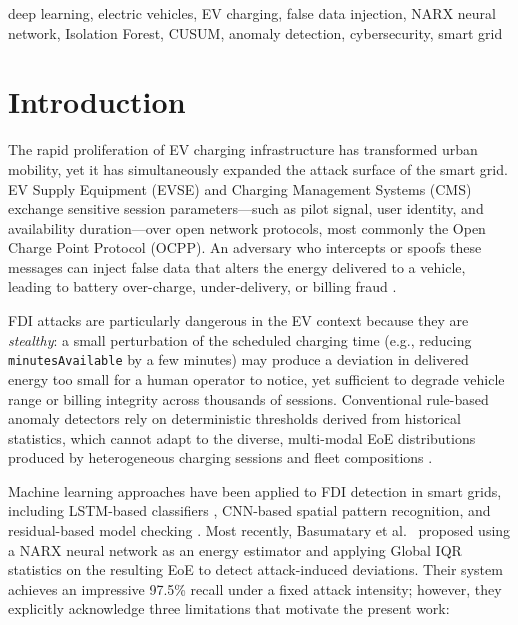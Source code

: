 \documentclass[journal]{IEEEtran}
\begin{document}
\begin{IEEEkeywords}
deep learning, electric vehicles, EV charging, false data injection,
NARX neural network, Isolation Forest, CUSUM, anomaly detection,
cybersecurity, smart grid
\end{IEEEkeywords}

\section{Introduction}
\label{sec:intro}

The rapid proliferation of EV charging infrastructure has transformed
urban mobility, yet it has simultaneously expanded the attack surface of
the smart grid. EV Supply Equipment (EVSE) and Charging Management
Systems (CMS) exchange sensitive session parameters---such as pilot
signal, user identity, and availability duration---over open network
protocols, most commonly the Open Charge Point Protocol (OCPP). An
adversary who intercepts or spoofs these messages can inject false data
that alters the energy delivered to a vehicle, leading to battery
over-charge, under-delivery, or billing fraud \cite{basumatary2025}.

FDI attacks are particularly dangerous in the EV context because they
are \emph{stealthy}: a small perturbation of the scheduled charging
time (e.g., reducing \texttt{minutesAvailable} by a few minutes) may
produce a deviation in delivered energy too small for a human operator
to notice, yet sufficient to degrade vehicle range or billing
integrity across thousands of sessions. Conventional rule-based anomaly
detectors rely on deterministic thresholds derived from historical
statistics, which cannot adapt to the diverse, multi-modal EoE
distributions produced by heterogeneous charging sessions and fleet
compositions \cite{alcaraz2017}.

Machine learning approaches have been applied to FDI detection in smart
grids, including LSTM-based classifiers \cite{guo2021}, CNN-based
spatial pattern recognition, and residual-based model checking
\cite{musleh2020}. Most recently, Basumatary et al.\ \cite{basumatary2025}
proposed using a NARX neural network as an energy estimator and
applying Global IQR statistics on the resulting EoE to detect
attack-induced deviations. Their system achieves an impressive 97.5\%
recall under a fixed attack intensity; however, they explicitly
acknowledge three limitations that motivate the present work:
\end{document}
